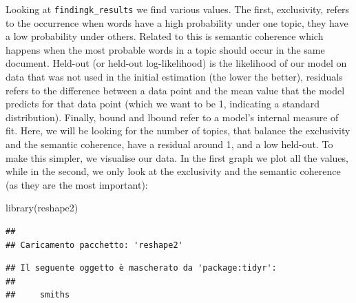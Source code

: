 \documentclass[
]{book}
\newenvironment{Shaded}{\begin{snugshade}}{\end{snugshade}}
\newcommand{\AttributeTok}[1]{\textcolor[rgb]{0.77,0.63,0.00}{#1}}
\newcommand{\FunctionTok}[1]{\textcolor[rgb]{0.00,0.00,0.00}{#1}}
\newcommand{\NormalTok}[1]{#1}
\newcommand{\OtherTok}[1]{\textcolor[rgb]{0.56,0.35,0.01}{#1}}
\newcommand{\SpecialCharTok}[1]{\textcolor[rgb]{0.00,0.00,0.00}{#1}}
\newcommand{\StringTok}[1]{\textcolor[rgb]{0.31,0.60,0.02}{#1}}
\begin{document}
Looking at \texttt{findingk\_results} we find various values. The first, exclusivity, refers to the occurrence when words have a high probability under one topic, they have a low probability under others. Related to this is semantic coherence which happens when the most probable words in a topic should occur in the same document. Held-out (or held-out log-likelihood) is the likelihood of our model on data that was not used in the initial estimation (the lower the better), residuals refers to the difference between a data point and the mean value that the model predicts for that data point (which we want to be 1, indicating a standard distribution). Finally, bound and lbound refer to a model's internal measure of fit. Here, we will be looking for the number of topics, that balance the exclusivity and the semantic coherence, have a residual around 1, and a low held-out. To make this simpler, we visualise our data. In the first graph we plot all the values, while in the second, we only look at the exclusivity and the semantic coherence (as they are the most important):

\begin{Shaded}
\begin{Highlighting}[]
\FunctionTok{library}\NormalTok{(reshape2)}
\end{Highlighting}
\end{Shaded}

\begin{verbatim}
## 
## Caricamento pacchetto: 'reshape2'
\end{verbatim}

\begin{verbatim}
## Il seguente oggetto è mascherato da 'package:tidyr':
## 
##     smiths
\end{verbatim}

\begin{Shaded}
\end{Shaded}
\end{document}
